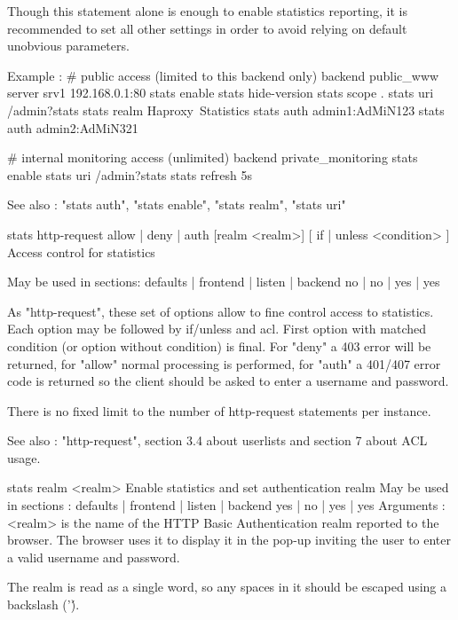   Though this statement alone is enough to enable statistics reporting, it is
  recommended to set all other settings in order to avoid relying on default
  unobvious parameters.

  Example :
    # public access (limited to this backend only)
    backend public_www
        server srv1 192.168.0.1:80
        stats enable
        stats hide-version
        stats scope   .
        stats uri     /admin?stats
        stats realm   Haproxy\ Statistics
        stats auth    admin1:AdMiN123
        stats auth    admin2:AdMiN321

    # internal monitoring access (unlimited)
    backend private_monitoring
        stats enable
        stats uri     /admin?stats
        stats refresh 5s

  See also : "stats auth", "stats enable", "stats realm", "stats uri"


stats http-request { allow | deny | auth [realm <realm>] }
             [ { if | unless } <condition> ]
  Access control for statistics

  May be used in sections:   defaults | frontend | listen | backend
                                no    |    no    |   yes  |   yes

  As "http-request", these set of options allow to fine control access to
  statistics. Each option may be followed by if/unless and acl.
  First option with matched condition (or option without condition) is final.
  For "deny" a 403 error will be returned, for "allow" normal processing is
  performed, for "auth" a 401/407 error code is returned so the client
  should be asked to enter a username and password.

  There is no fixed limit to the number of http-request statements per
  instance.

  See also : "http-request", section 3.4 about userlists and section 7
             about ACL usage.


stats realm <realm>
  Enable statistics and set authentication realm
  May be used in sections :   defaults | frontend | listen | backend
                                 yes   |    no    |   yes  |   yes
  Arguments :
    <realm>   is the name of the HTTP Basic Authentication realm reported to
              the browser. The browser uses it to display it in the pop-up
              inviting the user to enter a valid username and password.

  The realm is read as a single word, so any spaces in it should be escaped
  using a backslash ('\').

